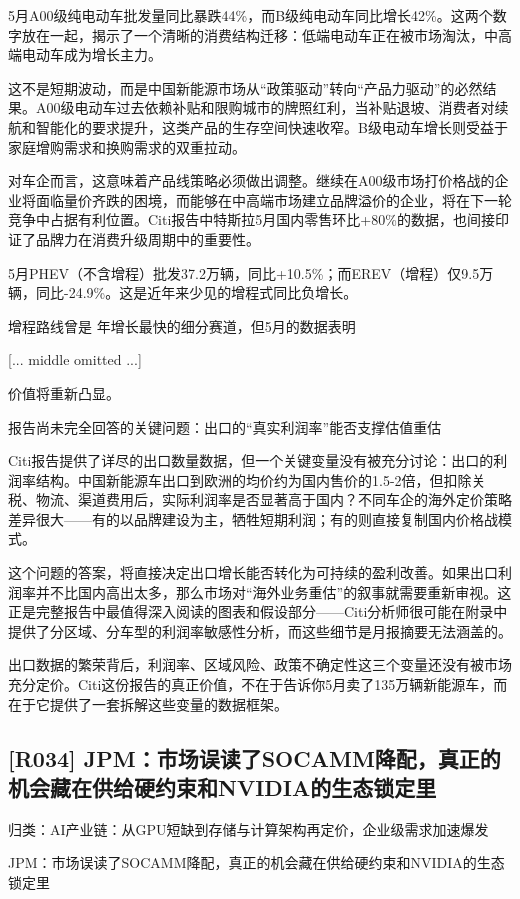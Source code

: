\documentclass[11pt]{ctexart}
\begin{document}
5月A00级纯电动车批发量同比暴跌44\%，而B级纯电动车同比增长42\%。这两个数字放在一起，揭示了一个清晰的消费结构迁移：低端电动车正在被市场淘汰，中高端电动车成为增长主力。

这不是短期波动，而是中国新能源市场从“政策驱动”转向“产品力驱动”的必然结果。A00级电动车过去依赖补贴和限购城市的牌照红利，当补贴退坡、消费者对续航和智能化的要求提升，这类产品的生存空间快速收窄。B级电动车增长则受益于家庭增购需求和换购需求的双重拉动。

对车企而言，这意味着产品线策略必须做出调整。继续在A00级市场打价格战的企业将面临量价齐跌的困境，而能够在中高端市场建立品牌溢价的企业，将在下一轮竞争中占据有利位置。Citi报告中特斯拉5月国内零售环比+80\%的数据，也间接印证了品牌力在消费升级周期中的重要性。

5月PHEV（不含增程）批发37.2万辆，同比+10.5\%；而EREV（增程）仅9.5万辆，同比-24.9\%。这是近年来少见的增程式同比负增长。

增程路线曾是 年增长最快的细分赛道，但5月的数据表明

[... middle omitted ...]

价值将重新凸显。

报告尚未完全回答的关键问题：出口的“真实利润率”能否支撑估值重估

Citi报告提供了详尽的出口数量数据，但一个关键变量没有被充分讨论：出口的利润率结构。中国新能源车出口到欧洲的均价约为国内售价的1.5-2倍，但扣除关税、物流、渠道费用后，实际利润率是否显著高于国内？不同车企的海外定价策略差异很大——有的以品牌建设为主，牺牲短期利润；有的则直接复制国内价格战模式。

这个问题的答案，将直接决定出口增长能否转化为可持续的盈利改善。如果出口利润率并不比国内高出太多，那么市场对“海外业务重估”的叙事就需要重新审视。这正是完整报告中最值得深入阅读的图表和假设部分——Citi分析师很可能在附录中提供了分区域、分车型的利润率敏感性分析，而这些细节是月报摘要无法涵盖的。

出口数据的繁荣背后，利润率、区域风险、政策不确定性这三个变量还没有被市场充分定价。Citi这份报告的真正价值，不在于告诉你5月卖了135万辆新能源车，而在于它提供了一套拆解这些变量的数据框架。

\subsection{[R034] JPM：市场误读了SOCAMM降配，真正的机会藏在供给硬约束和NVIDIA的生态锁定里}
{\small\color{refgray}归类：AI产业链：从GPU短缺到存储与计算架构再定价，企业级需求加速爆发}

JPM：市场误读了SOCAMM降配，真正的机会藏在供给硬约束和NVIDIA的生态锁定里
\end{document}
